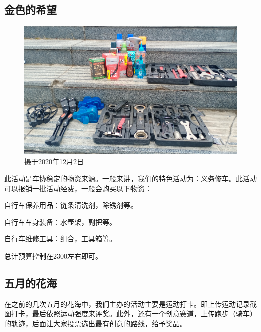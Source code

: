 \documentclass{ctexbook}
\begin{document}
\subsection{金色的希望}
\begin{figure}[htp]
    \centering
    \includegraphics[width=0.7\linewidth]{fig/金色的希望}
    \caption{摄于2020年12月2日}
    \label{fig:}
\end{figure}

此活动是车协稳定的物资来源。一般来讲，我们的特色活动为：义务修车。此活动可以报销一批活动经费，一般会购买以下物资：

自行车保养用品：链条清洗剂，除锈剂等。

自行车车身装备：水壶架，副把等。

自行车维修工具：组合，工具箱等。

总计预算控制在2300左右即可。
\subsection{五月的花海}
在之前的几次五月的花海中，我们主办的活动主要是运动打卡。即上传运动记录截图打卡，最后依照运动强度来评奖。此外，还有一个创意赛道，上传跑步（骑车）的轨迹，后面让大家投票选出最有创意的路线，给予奖品。
\end{document}
